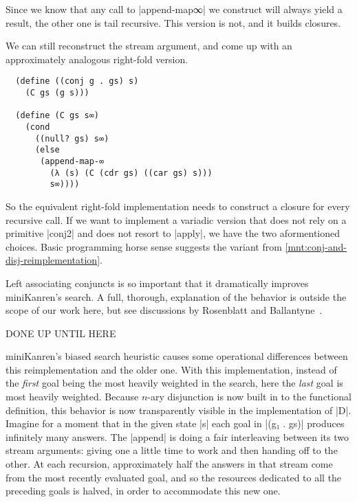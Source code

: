 \documentclass[sigplan,screen,draft,anonymous,review,natbib=false]{acmart}
\begin{document}
Since we know that any call to \rackinline|append-map∞| we construct
will always yield a result, the other one is tail recursive. This
version is not, and it builds closures.

We can still reconstruct the stream argument, and come up with an
approximately analogous right-fold version.

\begin{verbatim}
  (define ((conj g . gs) s)
    (C gs (g s)))

  (define (C gs s∞)
    (cond
      ((null? gs) s∞)
      (else
       (append-map-∞
         (λ (s) (C (cdr gs) ((car gs) s)))
         s∞))))
\end{verbatim}

So the equivalent right-fold implementation needs to construct a
closure for every recursive call. If we want to implement a variadic
version that does not rely on a primitive \rackinline|conj2| and does
not resort to \rackinline|apply|, we have the two aformentioned
choices. Basic programming horse sense suggests the variant from
\cref{mnt:conj-and-disj-reimplementation}.

Left associating conjuncts is so important that it dramatically
improves miniKanren's search. A full, thorough, explanation of the
behavior is outside the scope of our work here, but see discussions by
Rosenblatt and Ballantyne~\cite{here,nowhere}.


DONE UP UNTIL HERE

miniKanren's biased search heuristic causes some operational
differences between this reimplementation and the older one. With this
implementation, instead of the \emph{first} goal being the most
heavily weighted in the search, here the \emph{last} goal is most
heavily weighted. Because $n$-ary disjunction is now built in to the
functional definition, this behavior is now transparently visible in
the implementation of \rackinline|D|. Imagine for a moment that in
the given state \rackinline|s| each goal in \rackinline|(g₁ . gs)|
produces infinitely many answers. The \rackinline|append| is doing a
fair interleaving between its two stream arguments: giving one a
little time to work and then handing off to the other. At each
recursion, approximately half the answers in that stream come from the
most recently evaluated goal, and so the resources dedicated to all
the preceding goals is halved, in order to accommodate this new one.
\end{document}
